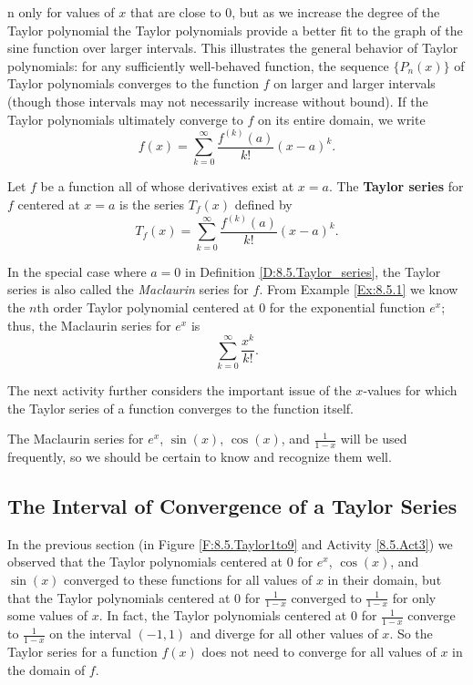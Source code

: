n only for values of $x$ that are close to 0, but as we increase the degree of the Taylor polynomial the Taylor polynomials provide a better fit to the graph of the sine function over larger intervals. This illustrates the general behavior of Taylor polynomials: for any sufficiently well-behaved function, the sequence $\{P_n(x)\}$ of Taylor polynomials converges to the function $f$ on larger and larger intervals (though those intervals may not necessarily increase without bound). If the Taylor polynomials ultimately converge to $f$ on its entire domain, we write
\[f(x) = \sum_{k=0}^{\infty} \frac{f^{(k)}(a)}{k!}(x-a)^k.\]

\begin{definition} \label{D:8.5.Taylor_series} 
Let $f$ be a function all of whose derivatives exist at $x=a$. The \textbf{Taylor series} for $f$ centered at $x=a$ is the series $T_f(x)$ defined by
\[T_f(x) = \sum_{k=0}^{\infty} \frac{f^{(k)}(a)}{k!}(x-a)^k.\]
\end{definition}

In the special case where $a=0$ in Definition \ref{D:8.5.Taylor_series}, the Taylor series is also called the \emph{Maclaurin} series for $f$.  From Example \ref{Ex:8.5.1} we know the $n$th order Taylor polynomial centered at 0 for the exponential function $e^x$; thus, the Maclaurin series for $e^x$ is
 \[\sum_{k=0}^{\infty} \frac{x^k}{k!}.\]
 
 
 
The next activity further considers the important issue of the $x$-values for which the Taylor series of a function converges to the function itself. 



The Maclaurin series for $e^x$, $\sin(x)$, $\cos(x)$, and $\frac{1}{1-x}$ will be used frequently, so we should be certain to know and recognize them well.

\subsection*{The Interval of Convergence of a Taylor Series}  

In the previous section (in Figure \ref{F:8.5.Taylor1to9} and Activity \ref{8.5.Act3}) we observed that the Taylor polynomials centered at 0 for $e^x$, $\cos(x)$, and $\sin(x)$ converged to these functions for all values of $x$ in their domain, but that the Taylor polynomials centered at 0 for $\frac{1}{1-x}$ converged to $\frac{1}{1-x}$ for only some values of $x$. In fact, the Taylor polynomials centered at 0 for $\frac{1}{1-x}$ converge to $\frac{1}{1-x}$ on the interval $(-1,1)$ and diverge for all other values of $x$. So the Taylor series for a function $f(x)$ does not need to converge for all values of $x$ in the domain of $f$. 

